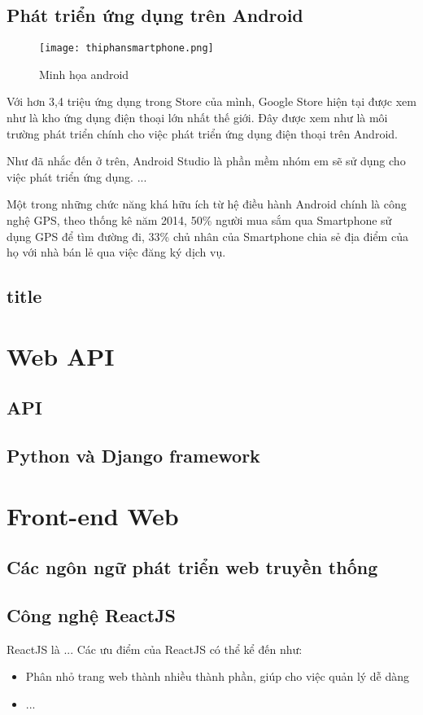 \documentclass[../thesis.tex]{subfiles}
\begin{document}
	\subsection{Phát triển ứng dụng trên Android}	
	\begin{figure}[ht!]
		\centering
		\texttt{[image: thiphansmartphone.png]}
		\caption{Minh họa android}
		\label{fig:minhhoa_android}
	\end{figure}	
	
	Với hơn 3,4 triệu ứng dụng trong Store của mình, Google Store hiện tại được xem như là kho ứng dụng điện thoại lớn nhất thế giới\cite{android:googlestore}. Đây được xem như là môi trường phát triển chính cho việc phát triển ứng dụng điện thoại trên Android.
	
	Như đã nhắc đến ở trên, Android Studio là phần mềm nhóm em sẽ sử dụng cho việc phát triển ứng dụng. ...
	
	Một trong những chức năng khá hữu ích từ hệ điều hành Android chính là công nghệ GPS, theo thống kê năm 2014, 50\% người mua sắm qua Smartphone sử dụng GPS để tìm đường đi, 33\% chủ nhân của Smartphone chia sẻ địa điểm của họ với nhà bán lẻ qua việc đăng ký dịch vụ.\cite{android:thongke1}
	
	\subsection{title}

\section{Web API}
	\subsection{API}
	\subsection{Python và Django framework}

\section{Front-end Web}
	\subsection{Các ngôn ngữ phát triển web truyền thống}
	\subsection{Công nghệ ReactJS}
		ReactJS là ...
		Các ưu điểm của ReactJS có thể kể đến như:
		\begin{itemize}
			\item Phân nhỏ trang web thành nhiều thành phần, giúp cho việc quản lý dễ dàng
			\item ...
		\end{itemize}
	
\end{document}
